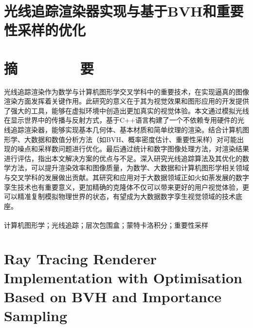 \section*{\heiti 光线追踪渲染器实现与基于BVH和重要性采样的优化}
\section*{\heiti 摘\ \ \ \ \ \ \ \ 要}
光线追踪渲染作为数学与计算机图形学交叉学科中的重要技术，在实现逼真的图像渲染方面发挥着关键作用。此研究的意义在于其为视觉效果和图形应用的开发提供了强大的工具，能够在虚拟环境中创造出更加真实的视觉体验。本文通过模拟光线在显示世界中的传播与反射方式，基于C++语言构建了一个不依赖专用硬件的光线追踪渲染器，能够实现基本几何体、基本材质和简单纹理的渲染。结合计算机图形学、大数据和数值分析方法（如BVH、概率密度估计、重要性采样）对可能出现的噪点和采样数问题进行优化。最后通过统计和数字图像处理方法，对渲染结果进行评估，指出本文解决方案的优点与不足。深入研究光线追踪算法及其优化的数学方法，可以提升渲染效率和图像质量，为数学、大数据和计算机图形学相关领域与交叉学科的发展做出贡献。其研究和应用对于大数据领域正如火如荼发展的数字孪生技术也有重要意义，更加精确的克隆体不仅可以带来更好的用户视觉体验，更可以精准复制模拟物理世界的状态，有望成为大数据数字孪生视觉领域的技术底座。
\\
\\
计算机图形学；光线追踪；层次包围盒；蒙特卡洛积分；重要性采样

\clearpage

\section*{\bfseries Ray Tracing Renderer Implementation with Optimisation Based on BVH and Importance Sampling}

